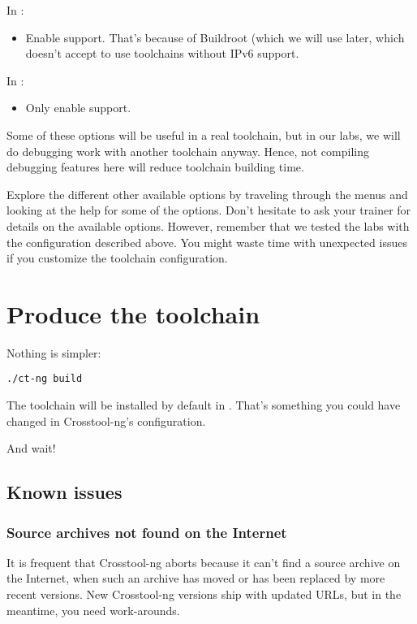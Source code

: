 In :
\begin{itemize}
  \item Enable  support. That's because of Buildroot (which
  we will use later, which doesn't accept to use toolchains without IPv6
  support.
\end{itemize}

In :
\begin{itemize}
\item Only enable  support.
\end{itemize}
Some of these options will be useful in a real toolchain, but in our
labs, we will do debugging work with another toolchain anyway.
Hence, not compiling debugging features here will reduce toolchain
building time.

Explore the different other available options by traveling through the
menus and looking at the help for some of the options. Don't hesitate
to ask your trainer for details on the available options. However,
remember that we tested the labs with the configuration described
above. You might waste time with unexpected issues if you customize the
toolchain configuration.

\section{Produce the toolchain}

Nothing is simpler:

\begin{verbatim}
./ct-ng build
\end{verbatim}

The toolchain will be installed by default in .
That's something you could have changed in Crosstool-ng's configuration.

And wait!

\subsection{Known issues}

\subsubsection{Source archives not found on the Internet}

It is frequent that Crosstool-ng aborts because it can't find a
source archive on the Internet, when such an archive has moved or has
been replaced by more recent versions. New Crosstool-ng versions ship
with updated URLs, but in the meantime, you need work-arounds.

